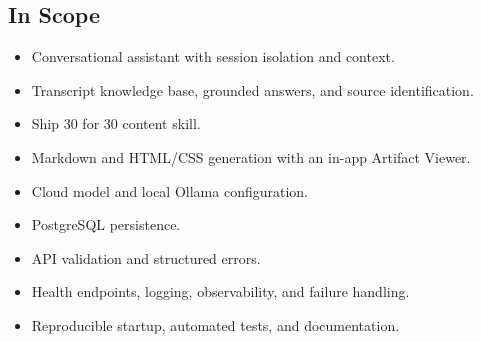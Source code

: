 \documentclass[11pt]{article}
\begin{document}
\subsection{In Scope}
\begin{itemize}
  \item Conversational assistant with session isolation and context.
  \item Transcript knowledge base, grounded answers, and source identification.
  \item Ship 30 for 30 content skill.
  \item Markdown and HTML/CSS generation with an in-app Artifact Viewer.
  \item Cloud model and local Ollama configuration.
  \item PostgreSQL persistence.
  \item API validation and structured errors.
  \item Health endpoints, logging, observability, and failure handling.
  \item Reproducible startup, automated tests, and documentation.
\end{itemize}
\end{document}
